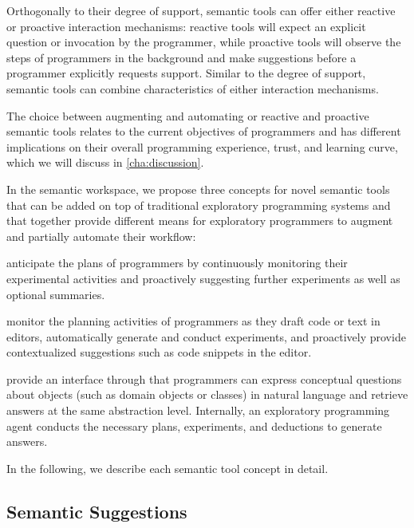 Orthogonally to their degree of support, semantic tools can offer either reactive or proactive interaction mechanisms:
reactive tools will expect an explicit question or invocation by the programmer, while proactive tools will observe the steps of programmers in the background and make suggestions before a programmer explicitly requests support.
Similar to the degree of support, semantic tools can combine characteristics of either interaction mechanisms.

The choice between augmenting and automating or reactive and proactive semantic tools relates to the current objectives of programmers and has different implications on their overall programming experience, trust, and learning curve, which we will discuss in \cref{cha:discussion}. %

In the semantic workspace, we propose three concepts for novel semantic tools that can be added on top of traditional exploratory programming systems and that together provide different means for exploratory programmers to augment and partially automate their workflow:

\begin{description}[noextralabelsep]
	\item[Semantic suggestions] anticipate the plans of programmers by continuously monitoring their experimental activities and proactively suggesting further experiments as well as optional summaries.
	\item[Semantic completions] monitor the planning activities of programmers as they draft code or text in editors, automatically generate and conduct experiments, and proactively provide contextualized suggestions such as code snippets in the editor.
	\item[Semantic conversations] provide an interface through that programmers can express conceptual questions about objects (such as domain objects or classes) in natural language and retrieve answers at the same abstraction level.
	Internally, an exploratory programming agent conducts the necessary plans, experiments, and deductions to generate answers.
\end{description}

In the following, we describe each semantic tool concept in detail.

\subsection{Semantic Suggestions}
\label{sec:approach/workspace/suggestions}

